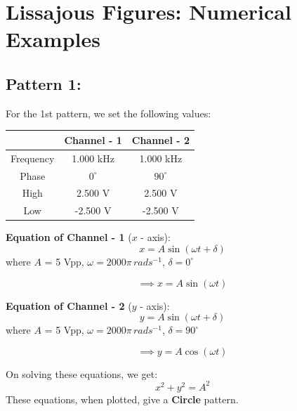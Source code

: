 \documentclass[12pt]{article}
\begin{document}
\section{Lissajous Figures: Numerical Examples}

\subsection{Pattern 1:}
For the 1st pattern, we set the following values:
\begin{table}[H]
    \centering
    \begin{tabular}{|c|c|c|}
    \hline
        & \textbf{Channel - 1} & \textbf{Channel - 2}\\
    \hline
    Frequency & 1.000 kHz & 1.000 kHz\\
    \hline
    Phase     & $0^{\circ}$ & $90^{\circ}$\\
    \hline
    High      & 2.500 V & 2.500 V\\
    \hline
    Low       & -2.500 V & -2.500 V\\
    \hline
    \end{tabular}
\end{table}

\textbf{Equation of Channel - 1} ($x$ - axis):
\[
x = A \sin{\left(\omega t + \delta\right)}
\]
where $A$ = 5 Vpp, $\omega = 2000 \pi \, rad s^{-1}$, $\delta = 0^{\circ}$

\[
\implies x = A \sin{\left(\omega t\right)}
\]

\textbf{Equation of Channel - 2} ($y$ - axis):
\[
y = A \sin{\left(\omega t + \delta\right)}
\]
where $A$ = 5 Vpp, $\omega = 2000 \pi \, rad s^{-1}$, $\delta = 90^{\circ}$

\[
\implies y = A \cos{\left(\omega t\right)}
\]

On solving these equations, we get:
\[
x^2 + y^2 = A^2
\]
These equations, when plotted, give a \textbf{Circle} pattern.
\end{document}

